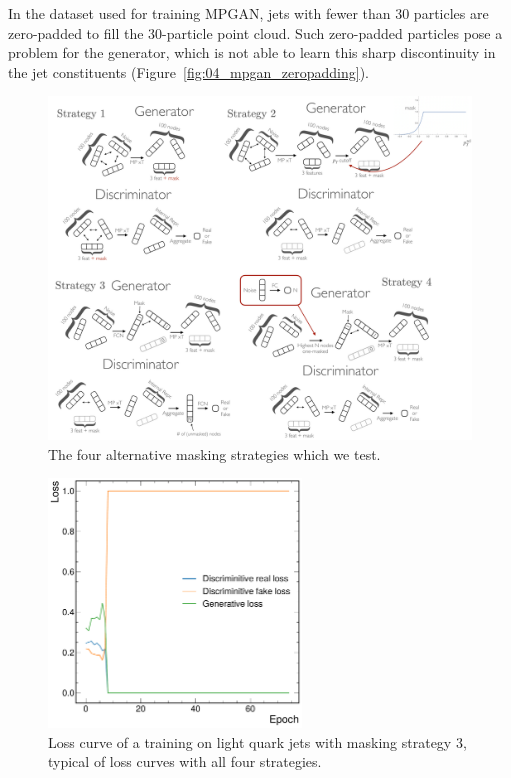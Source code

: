 In the \jetnet dataset used for training MPGAN, jets with fewer than 30 particles are zero-padded to fill the 30-particle point cloud.
Such zero-padded particles pose a problem for the generator, which is not able to learn this sharp discontinuity in the jet constituents (Figure~\ref{fig:04_mpgan_zeropadding}).


\begin{figure}[htpb]
    \centering
    \centerline{\includegraphics[width=\textwidth]{figures/04-ML4Sim/mpgan/masking/masking.pdf}}
    \caption{The four alternative masking strategies which we test.
    }
    \label{fig:04_mpgan_masking}
\end{figure}

\begin{figure}[htpb]
    \centering
    \centerline{\includegraphics[width=0.6\textwidth]{figures/04-ML4Sim/mpgan/masking/masking_loss.pdf}}
    \caption{Loss curve of a training on light quark jets with masking strategy 3, typical of loss curves with all four strategies.
    }
    \label{fig:04_mpgan_masking_loss}
\end{figure}

